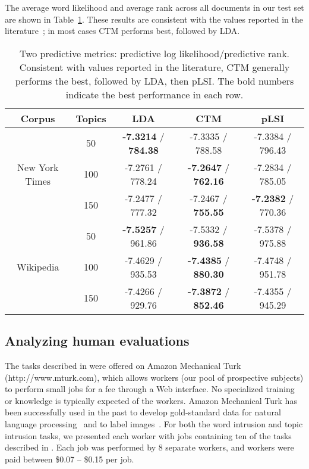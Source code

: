 The average word likelihood and average rank across all documents in
our test set are shown in Table~\ref{tab:word-prediction}.  These
results are consistent with the values reported in the
literature~\cite{blei-03,blei-06}; in most cases CTM performs best,
followed by LDA.

\begin{table}
  \caption{Two predictive metrics: predictive log likelihood/predictive rank.  Consistent with values reported in the literature, CTM generally performs the best, followed by LDA, then pLSI.  The bold numbers indicate the best performance in each row.}
\label{tab:word-prediction}
\centering
\footnotesize
\begin{sc}
\begin{tabular}{c|c|ccc}
Corpus & Topics & LDA & CTM & pLSI \\
\hline
\multirow{3}{*}{New York Times}
& 50  &  {\bf-7.3214} / {\bf 784.38}  &    -7.3335 / 788.58 & -7.3384 / 796.43\\
& 100 &  -7.2761 / 778.24  & {\bf -7.2647} / {\bf 762.16} & -7.2834 / 785.05 \\
& 150 &  -7.2477 / 777.32  & -7.2467 / {\bf 755.55} & {\bf -7.2382} /  770.36 \\
\hline
\multirow{3}{*}{Wikipedia}
& 50  & {\bf -7.5257} / 961.86 & -7.5332 / {\bf 936.58} & -7.5378 / 975.88 \\
& 100 & -7.4629 / 935.53 & {\bf -7.4385} / {\bf 880.30} & -7.4748 / 951.78 \\
& 150 & -7.4266 / 929.76 & {\bf -7.3872} / {\bf 852.46} & -7.4355 /  945.29 \\
\end{tabular}
\end{sc}
\vspace{0.2in}
\end{table}

\subsection{Analyzing human evaluations}

The tasks described in  were offered on Amazon
Mechanical Turk (http://www.mturk.com), which allows workers (our pool
of prospective subjects) to perform small jobs for a fee through a Web
interface.  No specialized training or knowledge is typically expected
of the workers.  Amazon Mechanical Turk has been successfully used in
the past to develop gold-standard data for natural language
processing~\cite{snow-08} and to label images~\cite{imagenet-cvpr09}.
For both the word intrusion and topic intrusion tasks, we presented
each worker with jobs containing ten of the tasks described in
.  Each job was performed by 8 separate workers, and
workers were paid between \$0.07 -- \$0.15 per job.

